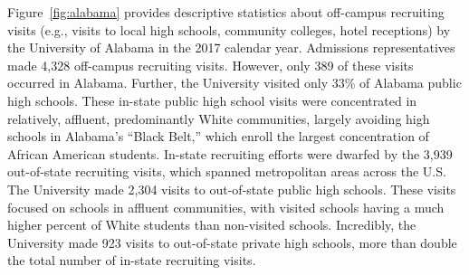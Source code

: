 \documentclass[twoside]{article}
\begin{document}
Figure~\ref{fig:alabama} provides descriptive statistics about off-campus recruiting visits (e.g., visits to local high schools, community colleges, hotel receptions) by the University of Alabama in the 2017 calendar year.  Admissions representatives made 4,328 off-campus recruiting visits.  However, only 389 of these visits occurred in Alabama.  Further, the University visited only 33\% of Alabama public high schools. These in-state public high school visits were concentrated in relatively, affluent, predominantly White communities, largely avoiding high schools in Alabama's ``Black Belt,'' which enroll the largest concentration of African American students.  In-state recruiting efforts were dwarfed by the 3,939 out-of-state recruiting visits, which spanned metropolitan areas across the U.S. The University made 2,304 visits to out-of-state public high schools. These visits focused on schools in affluent communities, with visited schools having a much higher percent of White students than non-visited schools.  Incredibly, the University made 923 visits to out-of-state private high schools, more than double the total number of in-state recruiting visits.

\end{document}
